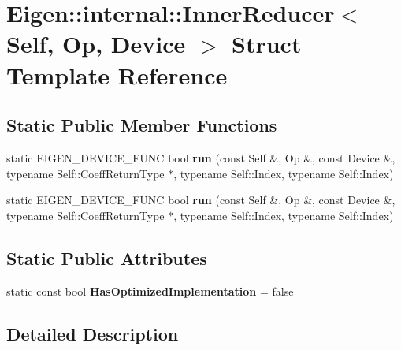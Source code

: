 \hypertarget{struct_eigen_1_1internal_1_1_inner_reducer}{}\section{Eigen\+:\+:internal\+:\+:Inner\+Reducer$<$ Self, Op, Device $>$ Struct Template Reference}
\label{struct_eigen_1_1internal_1_1_inner_reducer}
\subsection*{Static Public Member Functions}
\begin{DoxyCompactItemize}
\item 
\mbox{\label{struct_eigen_1_1internal_1_1_inner_reducer_ab0f80bf14245c83efc5e5616f2775a7e}} 
static E\+I\+G\+E\+N\+\_\+\+D\+E\+V\+I\+C\+E\+\_\+\+F\+U\+NC bool {\bfseries run} (const Self \&, Op \&, const Device \&, typename Self\+::\+Coeff\+Return\+Type $\ast$, typename Self\+::\+Index, typename Self\+::\+Index)
\item 
\mbox{\label{struct_eigen_1_1internal_1_1_inner_reducer_ab0f80bf14245c83efc5e5616f2775a7e}} 
static E\+I\+G\+E\+N\+\_\+\+D\+E\+V\+I\+C\+E\+\_\+\+F\+U\+NC bool {\bfseries run} (const Self \&, Op \&, const Device \&, typename Self\+::\+Coeff\+Return\+Type $\ast$, typename Self\+::\+Index, typename Self\+::\+Index)
\end{DoxyCompactItemize}
\subsection*{Static Public Attributes}
\begin{DoxyCompactItemize}
\item 
\mbox{\label{struct_eigen_1_1internal_1_1_inner_reducer_a8e764113f500503d875a9c586d97c75a}} 
static const bool {\bfseries Has\+Optimized\+Implementation} = false
\end{DoxyCompactItemize}


\subsection{Detailed Description}
